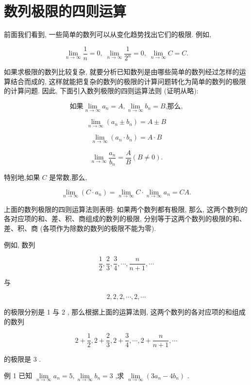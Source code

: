 \documentclass[lang=cn,newtx,10pt,scheme=chinese]{elegantbook}
\begin{document}
\section{数列极限的四则运算}
前面我们看到, 一些简单的数列可以从变化趋势找出它们的极限. 例如,

\[
\mathop{\lim }\limits_{{n \rightarrow \infty }}\frac{1}{n} = 0,\;\mathop{\lim }\limits_{{n \rightarrow \infty }}\frac{1}{{2}^{n}} = 0,\;\mathop{\lim }\limits_{{n \rightarrow \infty }}C = C.
\]

如果求极限的数列比较复杂, 就要分析已知数列是由哪些简单的数列经过怎样的运算结合而成的, 这样就能把复杂的数列的极限的计算问题转化为简单的数列的极限的计算问题. 因此, 下面引入数列极限的四则运算法则 (证明从略):

\[
\text{如果}\mathop{\lim }\limits_{{n \rightarrow \infty }}{a}_{n} = A,\mathop{\lim }\limits_{{n \rightarrow \infty }}{b}_{n} = B\text{,那么,}
\]

\[
\mathop{\lim }\limits_{{n \rightarrow \infty }}\left( {{a}_{n} \pm {b}_{n}}\right) = A \pm B
\]

\[
\mathop{\lim }\limits_{{n \rightarrow \infty }}\left( {{a}_{n} \cdot {b}_{n}}\right) = A \cdot B
\]

\[
\mathop{\lim }\limits_{{n \rightarrow \infty }}\frac{{a}_{n}}{{b}_{n}} = \frac{A}{B}\left( {B \neq 0}\right) .
\]

特别地,如果 \(C\) 是常数,那么,

\[
\mathop{\lim }\limits_{{n \rightarrow \infty }}\left( {C \cdot {a}_{n}}\right) = \mathop{\lim }\limits_{{n \rightarrow \infty }}C \cdot \mathop{\lim }\limits_{{n \rightarrow \infty }}{a}_{n} = {CA}.
\]

上面的数列极限的四则运算法则表明: 如果两个数列都有极限, 那么, 这两个数列的各对应项的和、差、积、商组成的数列的极限, 分别等于这两个数列的极限的和、差、积、商 (各项作为除数的数列的极限不能为零).

例如, 数列

\[
\frac{1}{2},\frac{2}{3},\frac{3}{4},\cdots ,\frac{n}{n + 1},\cdots
\]

与

\[
2,2,2,\cdots ,2,\cdots
\]

的极限分别是 1 与 2 , 那么根据上面的运算法则, 这两个数列的各对应项的和组成的数列

\[
2 + \frac{1}{2},2 + \frac{2}{3},2 + \frac{3}{4},\cdots ,2 + \frac{n}{n + 1},\cdots
\]

的极限是 3 .

例 1 已知 \(\mathop{\lim }\limits_{{n \rightarrow \infty }}{a}_{n} = 5,\mathop{\lim }\limits_{{n \rightarrow \infty }}{b}_{n} = 3\) ,求 \(\mathop{\lim }\limits_{{n \rightarrow \infty }}\left( {3{a}_{n} - 4{b}_{n}}\right)\) .
\end{document}
